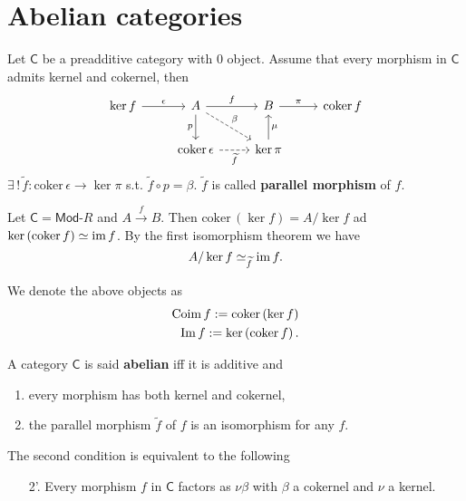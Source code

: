 \section{Abelian categories}

\begin{lem}
	Let $\mathsf{C}$ be a preadditive category with $0$ object.
	Assume that every morphism in $\mathsf{C}$ admits kernel and cokernel, then
	\begin{equation}
	\begin{tikzcd}
		\ker f \arrow[r, "\epsilon", rightarrow] & A \arrow[r, "f", rightarrow] \arrow[d, "p"', rightarrow] \arrow[rd, "\beta", dashrightarrow] &
		B \arrow[r, "\pi", rightarrow] & \mathrm{coker}\, f \\
					       & \mathrm{coker}\, \epsilon \arrow[r, "\widetilde{f}"', dashrightarrow] & \ker \pi \arrow[u, "\mu"', rightarrow] &
	\end{tikzcd}
	\end{equation} 
	$\exists\, !\, \widetilde{f}: \mathrm{coker}\, \epsilon \to \ker \pi$ s.t. $\widetilde{f} \circ p = \beta$.
	$\widetilde{f}$ is called \textbf{parallel morphism} of $f$.
\end{lem} 

\begin{ex}
	Let $\mathsf{C} = \mathsf{Mod}\text{-}R$ and $A \xrightarrow{f} B$.
	Then $\mathrm{coker}\, (\ker f) = A / \ker f$ ad $\ker \left( \mathrm{coker}\, f \right) \simeq \operatorname{im} f$.
	By the first isomorphism theorem we have
	\begin{equation}
	A/ \ker f \simeq_{\widetilde{f}} \operatorname{im} f
	.\end{equation} 
\end{ex} 

\begin{defn}
	We denote the above objects as
	\begin{align}
		\operatorname{Coim} f := \operatorname{coker} \left( \ker f \right)\\
		\operatorname{Im} f := \ker \left( \operatorname{coker} f \right)	
	.\end{align} 
\end{defn}

\begin{defn}
	A category $\mathsf{C}$ is said \textbf{abelian} iff it is additive and
	\begin{enumerate}
		\item every morphism has both kernel and cokernel,
		\item the parallel morphism $\widetilde{f}$ of $f$ is an isomorphism for any $f$.
	\end{enumerate}
	The second condition is equivalent to the following
	\begin{enumerate}
		\item[2'.] Every morphism $f$ in $\mathsf{C}$ factors as $\nu \beta$ with $\beta$ a cokernel and $\nu$ a kernel.
	\end{enumerate}
\end{defn}

